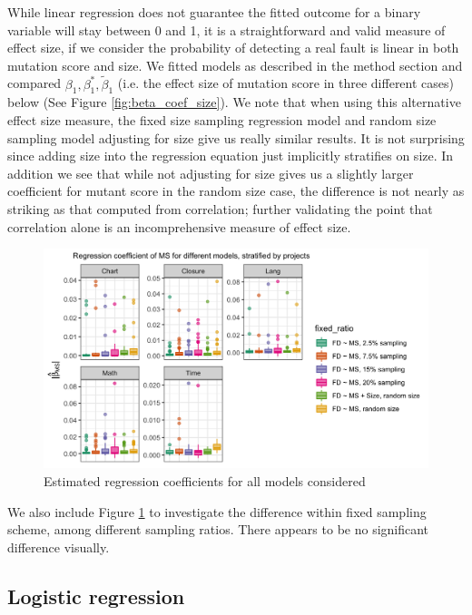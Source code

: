 \documentclass[10pt,letterpaper]{article}
\begin{document}
While linear regression does not guarantee the fitted outcome for a binary variable will stay between 0 and 1, it is a straightforward and valid measure of effect size, if we consider the probability of detecting a real fault is linear in both mutation score and size. We fitted models as described in the method section and compared $\beta_1,\beta^*_1,\tilde{\beta}_1$ (i.e. the effect size of mutation score in three different cases) below (See Figure \ref{fig:beta_coef_size}). We note that when using this alternative effect size measure, the fixed size sampling regression model and random size sampling model adjusting for size give us really similar results. It is not surprising since adding size into the regression equation just implicitly stratifies on size. In addition we see that while not adjusting for size gives us a slightly larger coefficient for mutant score in the random size case, the difference is not nearly as striking as that computed from correlation; further validating the point that correlation alone is an incomprehensive measure of effect size. 

      \begin{figure}[ht!]
        \centering
        \includegraphics[scale=0.15]{figures/stratified_beta_coef_size.png}
        \caption{Estimated regression coefficients for all models considered}
        \label{fig:stratified_beta_coef_size}
    \end{figure}



We also include Figure \ref{fig:stratified_beta_coef_size} to investigate the difference within fixed sampling scheme, among different sampling ratios. There appears to be no significant difference visually.


\subsection{Logistic regression}
\end{document}
